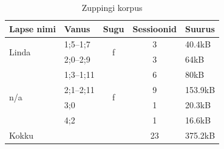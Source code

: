 \documentclass[12pt]{article}
\begin{document}
\begin{table}[H]
\centering
\caption{Zuppingi korpus}
\begin{tabular}{|l|l|c|c|l|}
\hline
Lapse nimi             & Vanus     & \multicolumn{1}{l|}{Sugu} & \multicolumn{1}{l|}{Sessioonid} & Suurus \\ \hline\hline
\multirow{2}{*}{Linda} & 1;5--1;7  & \multirow{2}{*}{f}        & 3                               & 40.4kB   \\ \cline{2-2} \cline{4-5} 
                       & 2;0--2;9  &                           & 3                               & 64kB     \\ \hline
\multirow{4}{*}{n/a}   & 1;3--1;11 & \multirow{4}{*}{f}        & 6                               & 80kB     \\ \cline{2-2} \cline{4-5} 
                       & 2;1--2;11 &                           & 9                               & 153.9kB  \\ \cline{2-2} \cline{4-5} 
                       & 3;0       &                           & 1                               & 20.3kB   \\ \cline{2-2} \cline{4-5} 
                       & 4;2       &                           & 1                               & 16.6kB   \\ \hline
Kokku                  & \multicolumn{2}{l|}{}                 & 23                              & 375.2kB  \\ \hline
\end{tabular}
\end{table}
\hfill
\end{document}
